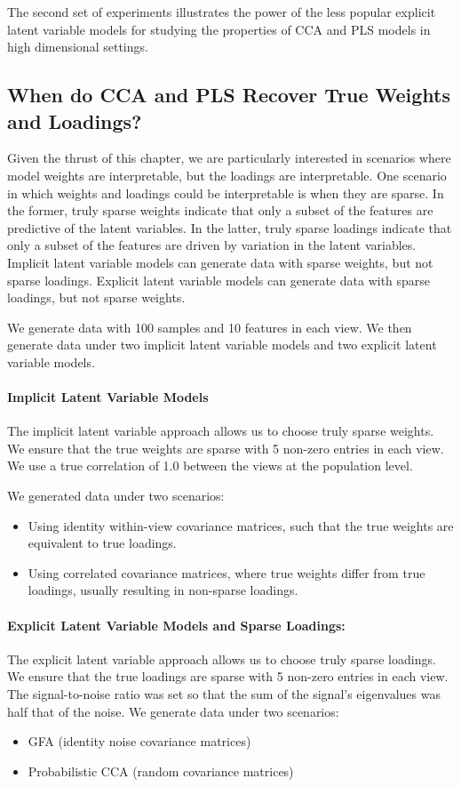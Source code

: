 The second set of experiments illustrates the power of the less popular explicit latent variable models for studying the properties of CCA and PLS models in high dimensional settings.

\subsection{When do CCA and PLS Recover True Weights and Loadings?}

Given the thrust of this chapter, we are particularly interested in scenarios where model weights are interpretable, but the \gls{loadings} are interpretable.
One scenario in which weights and loadings could be interpretable is when they are sparse.
In the former, truly sparse weights indicate that only a subset of the features are predictive of the latent variables.
In the latter, truly sparse \gls{loadings} indicate that only a subset of the features are driven by variation in the latent variables.
Implicit latent variable models can generate data with sparse weights, but not sparse \gls{loadings}.
Explicit latent variable models can generate data with sparse \gls{loadings}, but not sparse weights.

We generate data with 100 samples and 10 features in each view.
We then generate data under two implicit latent variable models and two explicit latent variable models.

\paragraph{Implicit Latent Variable Models}
The implicit latent variable approach allows us to choose truly sparse weights.
We ensure that the true weights are sparse with 5 non-zero entries in each view.
We use a true correlation of 1.0 between the views at the population level.

We generated data under two scenarios:
\begin{itemize}
    \item Using identity within-view covariance matrices, such that the true weights are equivalent to true loadings.
    \item Using correlated covariance matrices, where true weights differ from true loadings, usually resulting in non-sparse loadings.
\end{itemize}

\paragraph{Explicit Latent Variable Models and Sparse Loadings:}
The explicit latent variable approach allows us to choose truly sparse \gls{loadings}.
We ensure that the true \gls{loadings} are sparse with 5 non-zero entries in each view.
The signal-to-noise ratio was set so that the sum of the signal's eigenvalues was half that of the noise.
We generate data under two scenarios:
\begin{itemize}
    \item GFA (identity noise covariance matrices)
    \item Probabilistic CCA (random covariance matrices)
\end{itemize}

